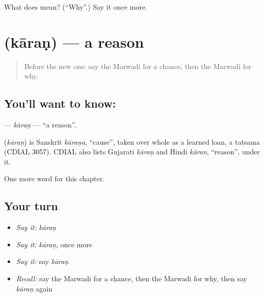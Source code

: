 \begin{tcolorbox}[breakable,colback=teal!4,colframe=teal!35!black,title={Before you move on}]
What does  mean? (\textquotedblleft{}Why\textquotedblright{}.) Say it once more.
\end{tcolorbox}
\section[\texorpdfstring{\mw{कारण} (kāraṇ)}{कारण (kāraṇ)}]{ (kāraṇ) — a reason}

\label{lesson:MW-C117-karan}



\begin{quote}
Before the new one: say the Marwadi for a chance, then the Marwadi for why.
\end{quote}

\subsection*{You'll want to know: }
\textbf{} — \emph{kāraṇ} — \textquotedblleft{}a reason\textquotedblright{}.

\begin{cousinweb}
\textbf{} (\emph{kāraṇ}) is Sanskrit \emph{kāraṇa}, \textquotedblleft{}cause\textquotedblright{}, taken over whole as a learned loan, a tatsama (CDIAL 3057). CDIAL also lists Gujarati \emph{kāraṇ} and Hindi \emph{kāran}, \textquotedblleft{}reason\textquotedblright{}, under it.
\end{cousinweb}

\begin{grammarlens}[title={What you've built}]
One more word for this chapter.
\end{grammarlens}

\subsection*{Your turn}
\begin{itemize}
\raggedright
  \item \emph{Say it:} \emph{kāraṇ}
  \item \emph{Say it:} \emph{kāraṇ}, once more
  \item \emph{Say it:} say \emph{kāraṇ}
  \item \emph{Recall:} say the Marwadi for a chance, then the Marwadi for why, then say \emph{kāraṇ} again
\end{itemize}


